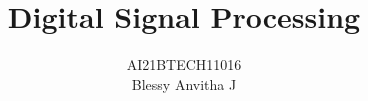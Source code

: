 \documentclass[journal,12pt,twocolumn]{IEEEtran}
\renewcommand\thesection{\arabic{section}}
\begin{document}
\makeatletter
\def\pld@CF@loop#1+{%
    \ifx\relax#1\else
        \begingroup
          \pld@AccuSetX11%
          \def\pld@frac{{}{}}\let\pld@symbols\@empty\let\pld@vars\@empty
          \pld@false
          #1%
          \let\pld@temp\@empty
          \pld@AccuIfOne{}{\pld@AccuGet\pld@temp
                            \edef\pld@temp{\noexpand\pld@R\pld@temp}}%
           \pld@if \pld@Extend\pld@temp{\expandafter\pld@F\pld@frac}\fi
           \expandafter\pld@CF@loop@\pld@symbols\relax\@empty
           \expandafter\pld@CF@loop@\pld@vars\relax\@empty
           \ifx\@empty\pld@temp
               \def\pld@temp{\pld@R11}%
           \fi
          \global\let\@gtempa\pld@temp
        \endgroup
        \ifx\@empty\@gtempa\else
            \pld@ExtendPoly\pld@tempoly\@gtempa
        \fi
        \expandafter\pld@CF@loop
    \fi}
\def\pld@CMAddToTempoly{%
    \pld@AccuGet\pld@temp\edef\pld@temp{\noexpand\pld@R\pld@temp}%
    \pld@CondenseMonomials\pld@false\pld@symbols
    \ifx\pld@symbols\@empty \else
        \pld@ExtendPoly\pld@temp\pld@symbols
    \fi
    \ifx\pld@temp\@empty \else
        \pld@if
            \expandafter\pld@IfSum\expandafter{\pld@temp}%
               {\expandafter\def\expandafter\pld@temp\expandafter
                    {\expandafter\pld@F\expandafter{\pld@temp}{}}}%
                {}%
        \fi
        \pld@ExtendPoly\pld@tempoly\pld@temp
        \pld@Extend\pld@tempoly{\pld@monom}%
    \fi}            
\makeatother
\lstset{
language=Python,
frame=single, 
breaklines=true,
columns=fullflexible
}
\let\StandardTheFigure\thefigure
\renewcommand{\thefigure}{\theproblem}
\def\putbox#1#2#3{\makebox[0in][l]{\makebox[#1][l]{}\raisebox{\baselineskip}[0in][0in]{\raisebox{#2}[0in][0in]{#3}}}}
     \def\rightbox#1{\makebox[0in][r]{#1}}
     \def\centbox#1{\makebox[0in]{#1}}
     \def\topbox#1{\raisebox{-\baselineskip}[0in][0in]{#1}}
     \def\midbox#1{\raisebox{-0.5\baselineskip}[0in][0in]{#1}}
\vspace{3cm}
\title{ 
Digital Signal Processing
}
\author{AI21BTECH11016 \\ Blessy Anvitha J} 

\maketitle
\tableofcontents
\renewcommand{\thefigure}{\theenumi}
\renewcommand{\thetable}{\theenumi}
\renewcommand{\vec}{\textbf}
\bigskip
\end{document}
